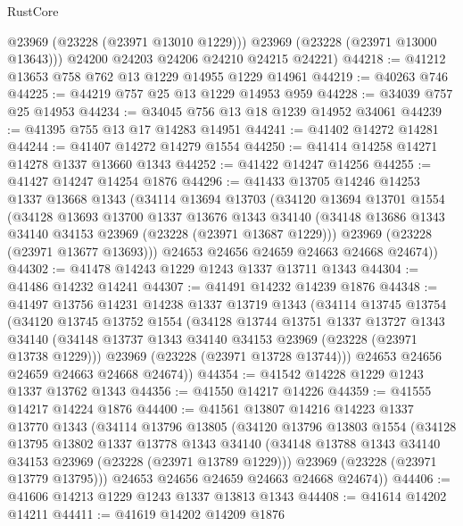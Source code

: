 \begin{lexlean}{RustCore}
\begin{coremodule}
          @23969
          (@23228 (@23971 @13010 @1229)))
        @23969
        (@23228 (@23971 @13000 @13643)))
      @24200
      @24203
      @24206
      @24210
      @24215
      @24221)
@44218 := @41212 @13653 @758 @762 @13 @1229 @14955 @1229 @14961
@44219 := @40263 @746
@44225 := @44219 @757 @25 @13 @1229 @14953 @959
@44228 := @34039 @757 @25 @14953
@44234 := @34045 @756 @13 @18 @1239 @14952 @34061
@44239 := @41395 @755 @13 @17 @14283 @14951
@44241 := @41402 @14272 @14281
@44244 := @41407 @14272 @14279 @1554
@44250 := @41414 @14258 @14271 @14278 @1337 @13660 @1343
@44252 := @41422 @14247 @14256
@44255 := @41427 @14247 @14254 @1876
@44296 := @41433
    @13705
    @14246
    @14253
    @1337
    @13668
    @1343
    (@34114
      @13694
      @13703
      (@34120
        @13694
        @13701
        @1554
        (@34128
          @13693
          @13700
          @1337
          @13676
          @1343
          @34140
          (@34148 @13686 @1343 @34140 @34153 @23969 (@23228 (@23971 @13687 @1229)))
          @23969
          (@23228 (@23971 @13677 @13693)))
        @24653
        @24656
        @24659
        @24663
        @24668
        @24674))
@44302 := @41478 @14243 @1229 @1243 @1337 @13711 @1343
@44304 := @41486 @14232 @14241
@44307 := @41491 @14232 @14239 @1876
@44348 := @41497
    @13756
    @14231
    @14238
    @1337
    @13719
    @1343
    (@34114
      @13745
      @13754
      (@34120
        @13745
        @13752
        @1554
        (@34128
          @13744
          @13751
          @1337
          @13727
          @1343
          @34140
          (@34148 @13737 @1343 @34140 @34153 @23969 (@23228 (@23971 @13738 @1229)))
          @23969
          (@23228 (@23971 @13728 @13744)))
        @24653
        @24656
        @24659
        @24663
        @24668
        @24674))
@44354 := @41542 @14228 @1229 @1243 @1337 @13762 @1343
@44356 := @41550 @14217 @14226
@44359 := @41555 @14217 @14224 @1876
@44400 := @41561
    @13807
    @14216
    @14223
    @1337
    @13770
    @1343
    (@34114
      @13796
      @13805
      (@34120
        @13796
        @13803
        @1554
        (@34128
          @13795
          @13802
          @1337
          @13778
          @1343
          @34140
          (@34148 @13788 @1343 @34140 @34153 @23969 (@23228 (@23971 @13789 @1229)))
          @23969
          (@23228 (@23971 @13779 @13795)))
        @24653
        @24656
        @24659
        @24663
        @24668
        @24674))
@44406 := @41606 @14213 @1229 @1243 @1337 @13813 @1343
@44408 := @41614 @14202 @14211
@44411 := @41619 @14202 @14209 @1876

\end{coremodule}
\end{lexlean}
